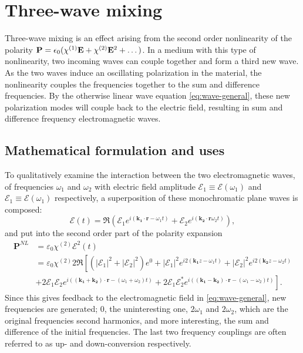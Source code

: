 \chapter{Three-wave mixing}
\label{cha:mixing}


Three-wave mixing is an effect arising from the second order
nonlinearity of the polarity $\mathbf P = \epsilon_0 ( \chi^{\textup{(1)}} \mathbf E +
\chi^{\textup{(2)}} \mathbf E^2 + \dots )$.
In a medium with this type of nonlinearity,
two incoming waves can couple together and form a third new wave.
As the two waves induce an oscillating polarization in the material,
the nonlinearity couples the frequencies together
to the sum and difference frequencies.
By the otherwise linear wave equation \cref{eq:wave-general},
these new polarization modes will couple back to the electric field,
resulting in sum and difference frequency electromagnetic waves.

\section{Mathematical formulation and uses}
\label{sec:mixing-math}

To qualitatively examine the interaction between the two electromagnetic waves, of frequencies $\omega_1$ and $\omega_2$ with electric field amplitude $\mathcal{E}_1  \equiv \mathcal{E}(\omega_1)$ and $\mathcal{E}_1  \equiv \mathcal{E}(\omega_1)$ respectively, a superposition of these monochromatic plane waves is composed: 
\[
\mathbf{\mathcal{E}}(t) = \Re (\mathcal{E}_1e^{i(\mathbf{k_1} \cdot \mathbf{r} - \omega_1 t)}+\mathcal{E}_2e^{i(\mathbf{k_2} \cdot \mathbf{r} \omega_2 t)}),
\]
and put into the second order part of the polarity expansion \cite[sec.~21.2C]{saleh}
\begin{align}
     \mathbf{P}^{NL} & = \varepsilon_0 \chi^{(2)} \mathbf{\mathcal{E}}^2(t) \nonumber \\
&= \varepsilon_0 \chi^{(2)} 2 \Re \left[
\left(|\mathcal{E}_1|^2+|\mathcal{E}_2|^2\right)e^{0} + |\mathcal{E}_1|^2e^{i2(\mathbf{k_1} z - \omega_1t)}+|\mathcal{E}_2|^2e^{i2(\mathbf{k_2} z - \omega_2t)} \right.\nonumber \\
& \left.
+ 2\mathcal{E}_1 \mathcal{E}_2e^{i((\mathbf{k_1} + \mathbf{k_2}) \cdot \mathbf{r} - (\omega_1+\omega_2)t)} 
+ 2\mathcal{E}_1 \mathcal{E}_2^*e^{i((\mathbf{k_1} - \mathbf{k_2}) \cdot \mathbf{r} - (\omega_1-\omega_2)t)} 
\right] \label{eq:MixPNL}.
\end{align}
Since this gives feedback to the electromagnetic field in \cref{eq:wave-general}, new frequencies are generated; $0$, the uninteresting one, $2\omega_1$ and $2\omega_2$, which are the original frequencies second harmonics, and more interesting, the sum and difference of the initial frequencies. The last two frequency couplings are often referred to as up- and down-conversion respectively.

